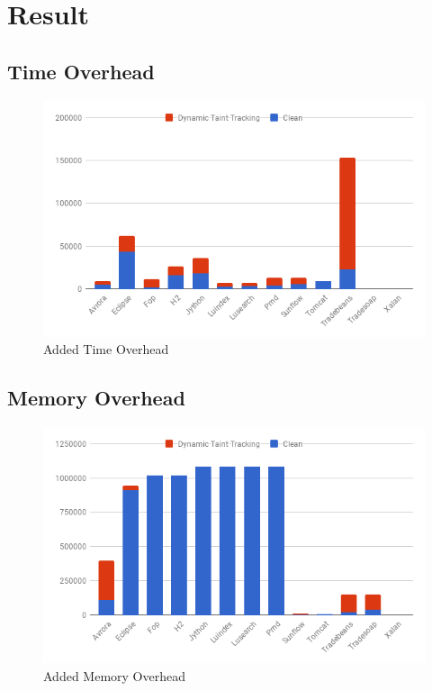 \chapter{Result}

\section{Time Overhead}
\begin{figure}[!h]
	\centering
	\includegraphics[width=\textwidth]{images/Time.png}
	\caption{Added Time Overhead}
	\label{fig:Time}
\end{figure}


\section{Memory Overhead}
\begin{figure}[!h]
	\centering
	\includegraphics[width=\textwidth]{images/Memory.png}
	\caption{Added Memory Overhead}
	\label{fig:Memory}
\end{figure}



